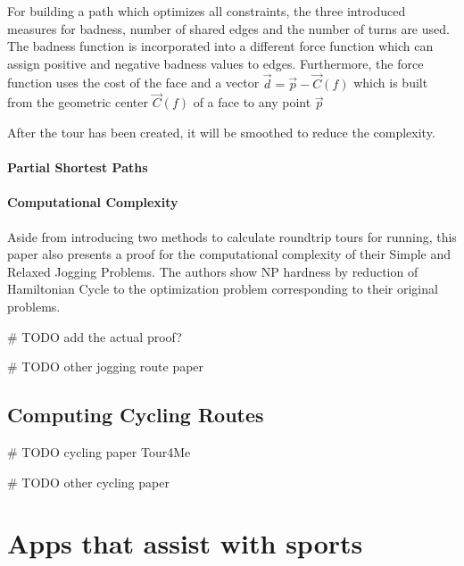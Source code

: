 For building a path which optimizes all constraints, the three introduced measures for badness, number of shared edges and the number of turns are used.
The badness function is incorporated into a different force function which can assign positive and negative badness values to edges.
Furthermore, the force function uses the cost of the face and a vector $\vec{d} = \vec{p} - \vec{C}(f)$ which is built from the geometric center $\vec{C}(f)$ of a face to any point $\vec{p}$
 


After the tour has been created, it will be smoothed to reduce the complexity.


\paragraph{Partial Shortest Paths}





\paragraph{Computational Complexity}

Aside from introducing two methods to calculate roundtrip tours for running, this paper also presents a proof for the computational complexity of their Simple and Relaxed Jogging Problems.
The authors show NP hardness by reduction of Hamiltonian Cycle to the optimization problem corresponding to their original problems.

 \# TODO add the actual proof?

\# TODO other jogging route paper







\subsection{Computing Cycling Routes}
\label{subsec:cyclingRoutes}
\# TODO cycling paper Tour4Me

\# TODO other cycling paper





\section{Apps that assist with sports}
\label{sec:runningApps}


